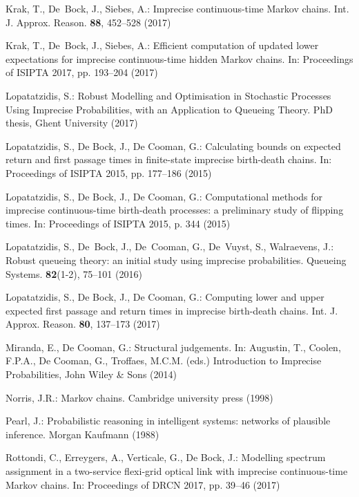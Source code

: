 \begin{thebibliography}{99.}
Krak, T., De~Bock, J., Siebes, A.: {Imprecise continuous-time {M}arkov chains}. Int. J. Approx. Reason. \textbf{88}, 452--528 (2017)

Krak, T., De~Bock, J., Siebes, A.: {Efficient computation of updated lower expectations for imprecise continuous-time hidden {M}arkov chains}. In: Proceedings of ISIPTA 2017, pp. 193--204 (2017)


Lopatatzidis, S.: {Robust Modelling and Optimisation in Stochastic Processes Using Imprecise Probabilities, with an Application to Queueing Theory}.
 PhD thesis, Ghent University (2017)

Lopatatzidis, S., De Bock, J., De Cooman, G.: {Calculating bounds on expected return and first passage times in finite-state imprecise birth-death chains}. In: Proceedings of ISIPTA 2015, pp. 177--186 (2015)

Lopatatzidis, S., De Bock, J., De Cooman, G.: {Computational methods for imprecise continuous-time birth-death processes: a preliminary study of flipping times}. In: Proceedings of ISIPTA 2015, p. 344 (2015)

Lopatatzidis, S., De~Bock, J., De~Cooman, G., De~Vuyst, S., Walraevens, J.: {Robust queueing theory: an initial study using imprecise probabilities}. Queueing Systems. \textbf{82}(1-2), 75--101 (2016)

Lopatatzidis, S., De Bock, J., De Cooman, G.: {Computing lower and upper expected first passage and return times in imprecise birth-death chains}. Int. J. Approx. Reason. \textbf{80}, 137--173 (2017) 



Miranda, E., De Cooman, G.: {Structural judgements}. In: Augustin, T., Coolen, F.P.A., De Cooman, G., Troffaes, M.C.M. (eds.) Introduction to Imprecise Probabilities, {John Wiley \& Sons} (2014) 


Norris, J.R.: {Markov chains}. Cambridge university press (1998)


Pearl, J.: {Probabilistic  reasoning  in  intelligent  systems: networks  of  plausible  inference}. Morgan  Kaufmann (1988)


Rottondi, C., Erreygers, A., Verticale, G., De Bock, J.: {Modelling spectrum assignment in a two-service flexi-grid optical link with imprecise continuous-time Markov chains}. In: Proceedings of DRCN 2017, pp. 39--46 (2017)



\end{thebibliography}
